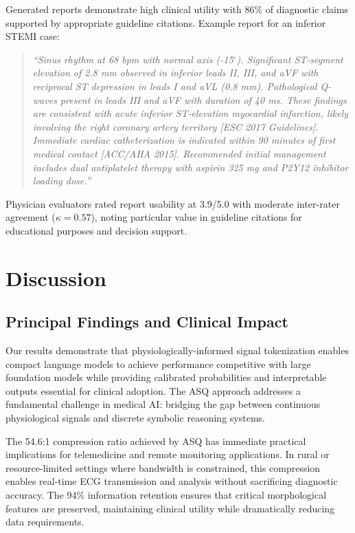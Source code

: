 \documentclass[journal]{IEEEtran}
\begin{document}
Generated reports demonstrate high clinical utility with 86\% of diagnostic claims supported by appropriate guideline citations. Example report for an inferior STEMI case:

\begin{quote}
\textit{``Sinus rhythm at 68 bpm with normal axis (-15$^\circ$). Significant ST-segment elevation of 2.8 mm observed in inferior leads II, III, and aVF with reciprocal ST depression in leads I and aVL (0.8 mm). Pathological Q-waves present in leads III and aVF with duration of 40 ms. These findings are consistent with acute inferior ST-elevation myocardial infarction, likely involving the right coronary artery territory [ESC 2017 Guidelines]. Immediate cardiac catheterization is indicated within 90 minutes of first medical contact [ACC/AHA 2015]. Recommended initial management includes dual antiplatelet therapy with aspirin 325 mg and P2Y12 inhibitor loading dose.''}
\end{quote}

Physician evaluators rated report usability at 3.9/5.0 with moderate inter-rater agreement ($\kappa=0.57$), noting particular value in guideline citations for educational purposes and decision support.

\section{Discussion}

\subsection{Principal Findings and Clinical Impact}

Our results demonstrate that physiologically-informed signal tokenization enables compact language models to achieve performance competitive with large foundation models while providing calibrated probabilities and interpretable outputs essential for clinical adoption. The ASQ approach addresses a fundamental challenge in medical AI: bridging the gap between continuous physiological signals and discrete symbolic reasoning systems.

The 54.6:1 compression ratio achieved by ASQ has immediate practical implications for telemedicine and remote monitoring applications. In rural or resource-limited settings where bandwidth is constrained, this compression enables real-time ECG transmission and analysis without sacrificing diagnostic accuracy. The 94\% information retention ensures that critical morphological features are preserved, maintaining clinical utility while dramatically reducing data requirements.
\end{document}
